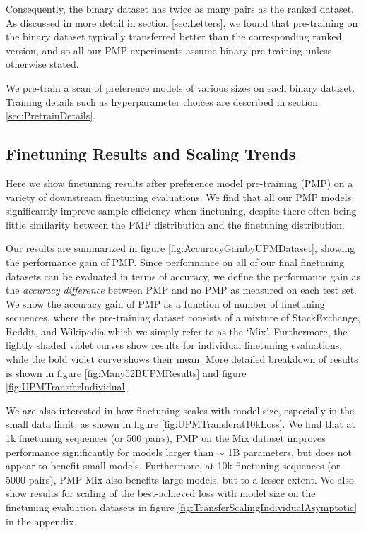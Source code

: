 Consequently, the binary dataset has twice as many pairs as the ranked dataset. As discussed in more detail in section \ref{sec:Letters}, we found that pre-training on the binary dataset typically transferred better than the corresponding ranked version, and so all our PMP experiments assume binary pre-training unless otherwise stated.

We pre-train a scan of preference models of various sizes on each binary dataset. Training details such as hyperparameter choices are described in section \ref{sec:PretrainDetails}.

\subsection{Finetuning Results and Scaling Trends}
\label{sec:UPMFinetuneResults}

Here we show finetuning results after preference model pre-training (PMP) on a variety of downstream finetuning evaluations.  We find that  all our PMP models significantly improve sample efficiency when finetuning, despite there often being little similarity between the PMP distribution and the finetuning distribution. 

Our results are summarized in figure \ref{fig:AccuracyGainbyUPMDataset}, showing the performance gain of PMP. Since performance on all of our final finetuning datasets can be evaluated in terms of accuracy, we define the performance gain as the {\it accuracy difference} between PMP and no PMP as measured on each test set. We show the accuracy gain of PMP as a function of number of finetuning sequences, where the pre-training dataset consists of a mixture of StackExchange, Reddit, and Wikipedia which we simply refer to as the `Mix'. Furthermore, the lightly shaded violet curves show results for individual finetuning evaluations, while the bold violet curve shows their mean. More detailed breakdown of results is shown in figure \ref{fig:Many52BUPMResults} and figure \ref{fig:UPMTransferIndividual}.

We are also interested in how finetuning scales with model size, especially in the small data limit, as shown in figure \ref{fig:UPMTransferat10kLoss}. We find that at 1k finetuning sequences (or 500 pairs), PMP on the Mix dataset improves performance significantly for models larger than $\sim$ 1B parameters, but does not appear to benefit small models. Furthermore, at 10k finetuning sequences (or 5000 pairs), PMP Mix also benefits large models, but to a lesser extent.   We also show results for  scaling of the best-achieved loss with model size on the finetuning evaluation datasets in figure \ref{fig:TransferScalingIndividualAsymptotic} in the appendix.

